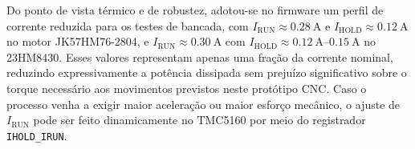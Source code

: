 Do ponto de vista t\'ermico e de robustez, adotou-se no firmware um
perfil de corrente reduzida para os testes de bancada, com
$I_{\text{RUN}} \approx \SI{0.28}{\ampere}$ e
$I_{\text{HOLD}} \approx \SI{0.12}{\ampere}$ no motor JK57HM76-2804, e
$I_{\text{RUN}} \approx \SI{0.30}{\ampere}$ com
$I_{\text{HOLD}} \approx \SIrange{0.12}{0.15}{\ampere}$ no 23HM8430.
Esses valores representam apenas uma fra\c{c}\~ao da corrente nominal,
reduzindo expressivamente a pot\^encia dissipada sem preju\'izo
significativo sobre o torque necess\'ario aos movimentos previstos neste
prot\'otipo CNC. Caso o processo venha a exigir maior acelera\c{c}\~ao ou
maior esfor\c{c}o mec\^anico, o ajuste de $I_{\text{RUN}}$ pode ser feito
dinamicamente no TMC5160 por meio do registrador
\texttt{IHOLD\_IRUN}.
